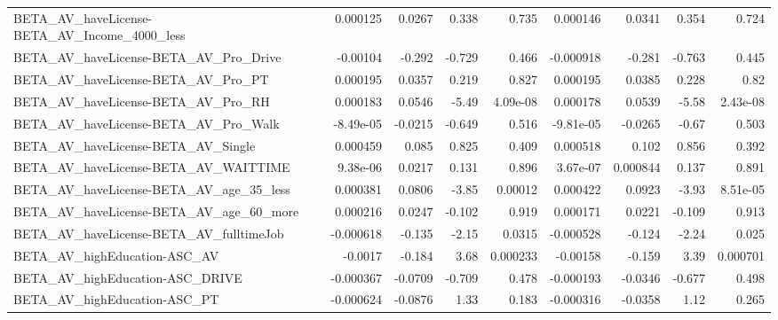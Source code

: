 \begin{tabular}{lrrrrrrrr}
BETA\_AV\_haveLicense-BETA\_AV\_Income\_4000\_less       &    0.000125 &       0.0267 &     0.338 &    0.735 &   0.000146 &      0.0341 &        0.354 &         0.724 \\
BETA\_AV\_haveLicense-BETA\_AV\_Pro\_Drive              &    -0.00104 &       -0.292 &    -0.729 &    0.466 &  -0.000918 &      -0.281 &       -0.763 &         0.445 \\
BETA\_AV\_haveLicense-BETA\_AV\_Pro\_PT                 &    0.000195 &       0.0357 &     0.219 &    0.827 &   0.000195 &      0.0385 &        0.228 &          0.82 \\
BETA\_AV\_haveLicense-BETA\_AV\_Pro\_RH                 &    0.000183 &       0.0546 &     -5.49 & 4.09e-08 &   0.000178 &      0.0539 &        -5.58 &      2.43e-08 \\
BETA\_AV\_haveLicense-BETA\_AV\_Pro\_Walk               &   -8.49e-05 &      -0.0215 &    -0.649 &    0.516 &  -9.81e-05 &     -0.0265 &        -0.67 &         0.503 \\
BETA\_AV\_haveLicense-BETA\_AV\_Single                 &    0.000459 &        0.085 &     0.825 &    0.409 &   0.000518 &       0.102 &        0.856 &         0.392 \\
BETA\_AV\_haveLicense-BETA\_AV\_WAITTIME               &    9.38e-06 &       0.0217 &     0.131 &    0.896 &   3.67e-07 &    0.000844 &        0.137 &         0.891 \\
BETA\_AV\_haveLicense-BETA\_AV\_age\_35\_less            &    0.000381 &       0.0806 &     -3.85 &  0.00012 &   0.000422 &      0.0923 &        -3.93 &      8.51e-05 \\
BETA\_AV\_haveLicense-BETA\_AV\_age\_60\_more            &    0.000216 &       0.0247 &    -0.102 &    0.919 &   0.000171 &      0.0221 &       -0.109 &         0.913 \\
BETA\_AV\_haveLicense-BETA\_AV\_fulltimeJob            &   -0.000618 &       -0.135 &     -2.15 &   0.0315 &  -0.000528 &      -0.124 &        -2.24 &         0.025 \\
BETA\_AV\_highEducation-ASC\_AV                       &     -0.0017 &       -0.184 &      3.68 & 0.000233 &   -0.00158 &      -0.159 &         3.39 &      0.000701 \\
BETA\_AV\_highEducation-ASC\_DRIVE                    &   -0.000367 &      -0.0709 &    -0.709 &    0.478 &  -0.000193 &     -0.0346 &       -0.677 &         0.498 \\
BETA\_AV\_highEducation-ASC\_PT                       &   -0.000624 &      -0.0876 &      1.33 &    0.183 &  -0.000316 &     -0.0358 &         1.12 &         0.265 \\

\end{tabular}
